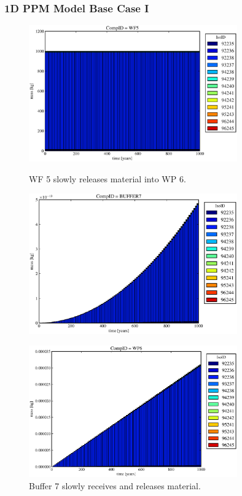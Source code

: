 

\begin{frame}
\frametitle{1D PPM Model Base Case I}
\begin{figure}[ht]
\begin{minipage}[b]{0.45\linewidth}

  \includegraphics[width=0.8\textwidth]{./images/od1.eps}
  \caption[Case ODI Waste Form Contaminants.]{
    WF 5 slowly releases material into WP 6.
    }
  \label{fig:drIVwf5}
  \includegraphics[width=0.8\textwidth]{./images/od3.eps}
  \caption[Case ODI Buffer Contaminants]{
    Buffer 7 slowly receives and releases material.
    }
  \label{fig:drIVbuff}
\end{minipage}
\hspace{0.05\linewidth}
\begin{minipage}[b]{0.45\linewidth}
  \includegraphics[width=0.8\textwidth]{./images/od2.eps}

\end{minipage}
\end{figure}
\end{frame}
